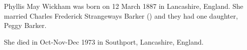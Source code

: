 
Phyllis May Wickham was born on 12 March 1887 in Lancashire, England.  She married Charles Frederick Strangeways Barker () and they had one daughter, Peggy Barker.  

She died in Oct-Nov-Dec 1973 in Southport, Lancashire, England.\cite{PhyllisWickhamDeath}

